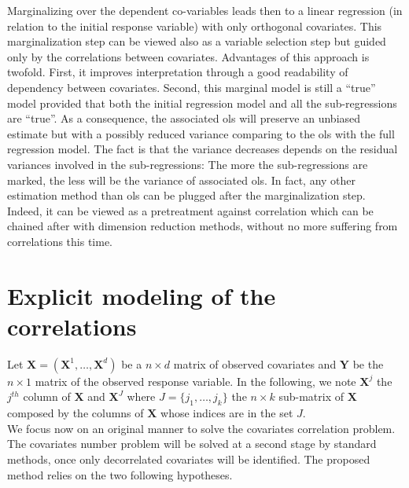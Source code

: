 \documentclass[12pt,a4paper]{report}
\begin{document}
 Marginalizing over the dependent co-variables leads then to a linear regression (in relation to the initial response variable) with only orthogonal covariates. This marginalization step can be viewed also as a variable selection step but guided only by the correlations between covariates. Advantages of this approach is twofold. First, it improves interpretation through a good readability of dependency between covariates. Second, this marginal model is still a ``true'' model provided that both the initial regression model and all the sub-regressions are ``true''. As a consequence, the associated {\sc ols} will preserve an unbiased estimate but with a possibly reduced variance comparing to the {\sc ols} with the full regression model. The fact is that the variance decreases depends on the residual variances involved in the sub-regressions: The more the sub-regressions are marked, the less will be the variance of associated {\sc ols}. In fact, any other estimation method than {\sc ols} can be plugged after the marginalization step. Indeed, it can be viewed as a pretreatment against correlation which can be chained after with dimension reduction methods, without no more suffering from correlations this time.

\section{Explicit modeling of the correlations}
	Let $\boldsymbol{X}=(\boldsymbol{X}^1,\dots,\boldsymbol{X}^d)$ be a $n \times d$ matrix of observed covariates and $\boldsymbol{Y}$ be the $n \times 1$ matrix of the observed response variable. In the following, we note $\boldsymbol{X}^j$ the $j^{th}$ column of $\boldsymbol{X}$ and $\boldsymbol{X}^{J}$ where $J=\{j_1,\dots,j_k\}$ the $n\times k$ sub-matrix of $\boldsymbol{X}$ composed by the columns of $\boldsymbol{X}$ whose indices are in the set $J$. 
\\




We focus now on an original manner to solve the covariates correlation problem. The covariates number problem will be solved at a second stage by standard methods, once only decorrelated covariates will be identified. The proposed method relies on the two following hypotheses.
\end{document}
